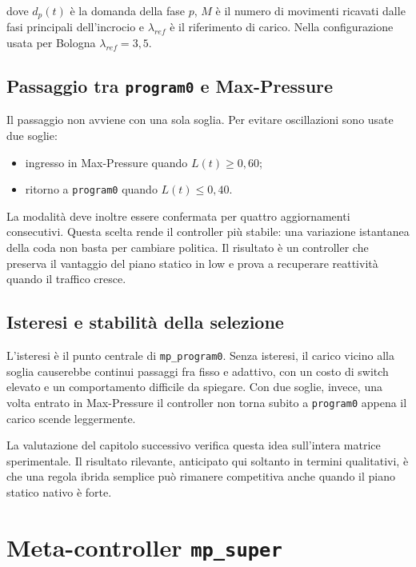 \documentclass[12pt,a4paper,oneside]{report}
\numberwithin{equation}{chapter}
\begin{document}
dove \(d_p(t)\) è la domanda della fase \(p\), \(M\) è il numero di movimenti
ricavati dalle fasi principali dell'incrocio e \(\lambda_{ref}\) è il
riferimento di carico. Nella configurazione usata per Bologna
\(\lambda_{ref}=3{,}5\).

\subsection{Passaggio tra \texttt{program0} e Max-Pressure}

Il passaggio non avviene con una sola soglia. Per evitare oscillazioni sono
usate due soglie:

\begin{itemize}
    \item ingresso in Max-Pressure quando \(L(t)\geq 0{,}60\);
    \item ritorno a \texttt{program0} quando \(L(t)\leq 0{,}40\).
\end{itemize}

La modalità deve inoltre essere confermata per quattro aggiornamenti consecutivi. Questa
scelta rende il controller più stabile: una variazione istantanea della coda
non basta per cambiare politica. Il risultato è un controller che preserva il
vantaggio del piano statico in low e prova a recuperare reattività quando il
traffico cresce.

\subsection{Isteresi e stabilità della selezione}

L'isteresi è il punto centrale di \texttt{mp\_program0}. Senza isteresi, il
carico vicino alla soglia causerebbe continui passaggi fra fisso e adattivo,
con un costo di switch elevato e un comportamento difficile da spiegare. Con
due soglie, invece, una volta entrato in Max-Pressure il controller non torna
subito a \texttt{program0} appena il carico scende leggermente.

La valutazione del capitolo successivo verifica questa idea sull'intera matrice
sperimentale. Il risultato rilevante, anticipato qui soltanto in termini
qualitativi, è che una regola ibrida semplice può rimanere competitiva anche
quando il piano statico nativo è forte.

\section{Meta-controller \texttt{mp\_super}}
\end{document}
